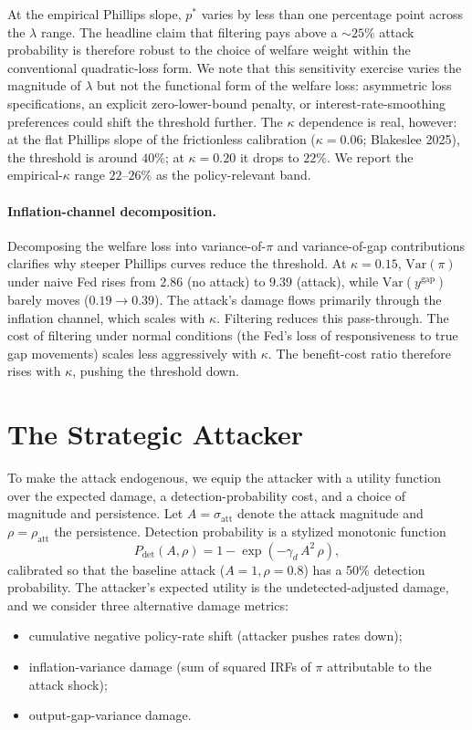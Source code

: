 \documentclass[12pt]{article}
\begin{document}
At the empirical Phillips slope, \(p^*\) varies by less than one percentage point across the \(\lambda\) range. The headline claim that filtering pays above a \(\sim 25\%\) attack probability is therefore robust to the choice of welfare weight within the conventional quadratic-loss form. We note that this sensitivity exercise varies the magnitude of \(\lambda\) but not the functional form of the welfare loss: asymmetric loss specifications, an explicit zero-lower-bound penalty, or interest-rate-smoothing preferences could shift the threshold further. The \(\kappa\) dependence is real, however: at the flat Phillips slope of the frictionless calibration (\(\kappa = 0.06\); Blakeslee 2025), the threshold is around \(40\%\); at \(\kappa = 0.20\) it drops to \(22\%\). We report the empirical-\(\kappa\) range \(22\)--\(26\%\) as the policy-relevant band.

\paragraph{Inflation-channel decomposition.}
Decomposing the welfare loss into variance-of-\(\pi\) and variance-of-gap contributions clarifies why steeper Phillips curves reduce the threshold. At \(\kappa = 0.15\), \(\mathrm{Var}(\pi)\) under naive Fed rises from \(2.86\) (no attack) to \(9.39\) (attack), while \(\mathrm{Var}(y^{\text{gap}})\) barely moves (\(0.19 \to 0.39\)). The attack's damage flows primarily through the inflation channel, which scales with \(\kappa\). Filtering reduces this pass-through. The cost of filtering under normal conditions (the Fed's loss of responsiveness to true gap movements) scales less aggressively with \(\kappa\). The benefit-cost ratio therefore rises with \(\kappa\), pushing the threshold down.

\section{The Strategic Attacker}\label{sec:attacker}

To make the attack endogenous, we equip the attacker with a utility function over the expected damage, a detection-probability cost, and a choice of magnitude and persistence. Let \(A = \sigma_{\text{att}}\) denote the attack magnitude and \(\rho = \rho_{\text{att}}\) the persistence. Detection probability is a stylized monotonic function
\begin{equation}\label{eq:det}
P_{\text{det}}(A, \rho) = 1 - \exp(-\gamma_d \, A^2 \, \rho),
\end{equation}
calibrated so that the baseline attack (\(A = 1, \rho = 0.8\)) has a 50\% detection probability. The attacker's expected utility is the undetected-adjusted damage, and we consider three alternative damage metrics:
\begin{itemize}
\item[(a)] cumulative negative policy-rate shift (attacker pushes rates down);
\item[(b)] inflation-variance damage (sum of squared IRFs of \(\pi\) attributable to the attack shock);
\item[(c)] output-gap-variance damage.
\end{itemize}
\end{document}
